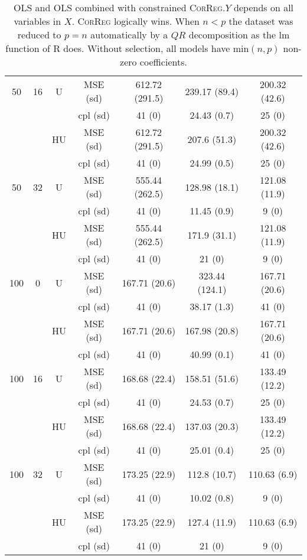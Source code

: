 \documentclass[11pt,a4paper]{article}
\begin{document}
\begin{table}[h!]
\begin{tabular}{|c|c|c|c|c|c|c|}
\hline %
50 & 16 & U&MSE (sd) & 612.72 (291.5) & 239.17 (89.4) & 200.32 (42.6) \\	
& & & cpl (sd) & 41 (0) & 24.43 (0.7) & 25 (0) \\
 &  &HU &MSE (sd) & 612.72 (291.5) & 207.6 (51.3) & 200.32 (42.6) \\
& & & cpl (sd) & 41 (0) & 24.99 (0.5) & 25 (0) \\
\hline %
50 & 32 & U&MSE (sd) & 555.44 (262.5) & 128.98 (18.1) & 121.08 (11.9) \\
& & & cpl (sd) & 41 (0) & 11.45 (0.9) & 9 (0) \\
 &  &HU &MSE (sd) & 555.44 (262.5) & 171.9 (31.1) & 121.08 (11.9) \\
& & &cpl (sd) & 41 (0) & 21 (0) & 9 (0) \\
\hline
\hline %
100 & 0 & U& MSE (sd) & 167.71 (20.6) & 323.44 (124.1) & 167.71 (20.6) \\
& & & cpl (sd) & 41 (0) & 38.17 (1.3) & 41 (0) \\
 &  &HU &MSE (sd) & 167.71 (20.6) & 167.98 (20.8) & 167.71 (20.6) \\  
& & & cpl (sd) & 41 (0) & 40.99 (0.1) & 41 (0) \\
\hline %
100 & 16 & U&  MSE (sd) & 168.68 (22.4) & 158.51 (51.6) & 133.49 (12.2) \\
& & & cpl (sd) & 41 (0) & 24.53 (0.7) & 25 (0) \\
 &  &HU &  MSE (sd) & 168.68 (22.4) & 137.03 (20.3) & 133.49 (12.2) \\
& & & cpl (sd) & 41 (0) & 25.01 (0.4) & 25 (0) \\
\hline %
100 & 32 & U&  MSE (sd) & 173.25 (22.9) & 112.8 (10.7) & 110.63 (6.9) \\
& & & cpl (sd) & 41 (0) & 10.02 (0.8) & 9 (0) \\
 &  &HU & MSE (sd) & 173.25 (22.9) & 127.4 (11.9) & 110.63 (6.9) \\
& & & cpl (sd) & 41 (0) & 21 (0) & 9 (0) \\
\hline
\end{tabular} 
\caption{OLS and OLS combined with constrained \textsc{CorReg}.$Y$  depends on all variables in $X$. \textsc{CorReg} logically wins. When $n<p$ the dataset was reduced to $p=n$ automatically by a $QR$ decomposition as the lm function of R does. Without selection, all models have min$(n,p)$ non-zero coefficients.} \label{YXlinOLS}
\end{table}
\end{document}
